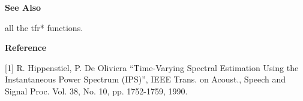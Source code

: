 {\bf \large {}\selectfont See Also}\\
\hspace*{1.5cm}
\begin{minipage}[t]{13.5cm}
all the {\ty tfr*} functions.
\end{minipage}
\vspace*{.2cm}


{\bf \large {}\selectfont Reference}\\
\hspace*{1.5cm}
\begin{minipage}[t]{13.5cm}
[1] R. Hippenstiel, P. De Oliviera ``Time-Varying Spectral Estimation Using
the Instantaneous Power Spectrum (IPS)'', IEEE Trans. on Acoust., Speech and
Signal Proc. Vol. 38, No. 10, pp. 1752-1759, 1990.
\end{minipage}
